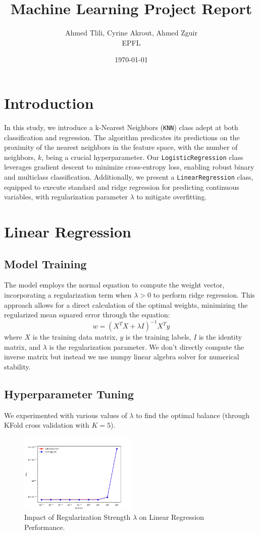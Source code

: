 \documentclass[10pt,twocolumn]{article}
\title{Machine Learning Project Report}
\author{Ahmed Tlili, Cyrine Akrout, Ahmed Zguir \\ EPFL}
\date{\today}
\begin{document}
\maketitle

\section{Introduction}
In this study, we introduce a k-Nearest Neighbors (\texttt{KNN}) class adept at both classification and regression. The algorithm predicates its predictions on the proximity of the nearest neighbors in the feature space, with the number of neighbors, \(k\), being a crucial hyperparameter. Our \texttt{LogisticRegression} class leverages gradient descent to minimize cross-entropy loss, enabling robust binary and multiclass classification. Additionally, we present a \texttt{LinearRegression} class, equipped to execute standard and ridge regression for predicting continuous variables, with regularization parameter \(\lambda\) to mitigate overfitting.

\section{Linear Regression}

\subsection{Model Training}
The model employs the normal equation to compute the weight vector, incorporating a regularization term when \(\lambda > 0\) to perform ridge regression. This approach allows for a direct calculation of the optimal weights, minimizing the regularized mean squared error through the equation:
\[w = (X^TX + \lambda I)^{-1}X^Ty\]
where \(X\) is the training data matrix, \(y\) is the training labels, \(I\) is the identity matrix, and \(\lambda\) is the regularization parameter.
We don't directly compute the inverse matrix but instead we use numpy linear algebra solver for numerical stability.

\subsection{Hyperparameter Tuning}
We experimented with various values of \(\lambda\) to find the optimal balance (through KFold cross validation with \(K = 5\)).
\begin{figure}[htbp]
\centering
\includegraphics[width=0.5\textwidth]{LinearRegression.png}
\caption{Impact of Regularization Strength \(\lambda\) on Linear Regression Performance. }
\label{fig:image1}
\end{figure}
\end{document}
